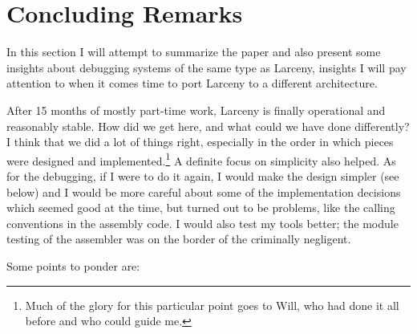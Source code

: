 \section{Concluding Remarks}

In this section I will attempt to summarize the paper and also present some
insights about debugging systems of the same type as Larceny, insights I
will pay attention to when it comes time to port Larceny to a different 
architecture.

After 15 months of mostly part-time work, Larceny is finally operational and
reasonably stable. How did we get here, and what could we have done
differently? I think that we did a lot of things right, especially in the
order in which pieces were designed and implemented.\footnote{Much of the
glory for this particular point goes to Will, who had done it all before and
who could guide me.} A definite focus on simplicity also helped. As for
the debugging, if I were to do it again, I would make the design simpler
(see below) and I would be more careful about some of the implementation
decisions which seemed good at the time, but turned out to be problems,
like the calling conventions in the assembly code. I would also test my
tools better; the module testing of the assembler was on the border of
the criminally negligent.

Some points to ponder are:

